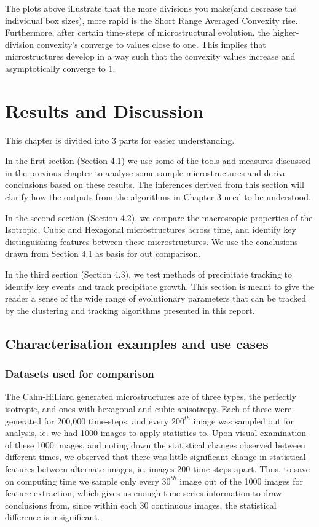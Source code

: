 \documentclass[12pt, a4paper]{report}
\begin{document}
The plots above illustrate that the more divisions you make(and decrease the individual box sizes), more rapid is the Short Range Averaged Convexity rise. Furthermore, after certain time-steps of microstructural evolution, the higher-division convexity's converge to values close to one. This implies that microstructures develop in a way such that the convexity values increase and asymptotically converge to 1.



\chapter{Results and Discussion}
This chapter is divided into 3 parts for easier understanding. 

In the first section (Section 4.1) we use some of the tools and measures discussed in the previous chapter to analyse some sample microstructures and derive conclusions based on these results. The inferences derived from this section will clarify how the outputs from the algorithms in Chapter 3 need to be understood. 

In the second section (Section 4.2), we compare the macroscopic properties of the Isotropic, Cubic and Hexagonal microstructures across time, and identify key distinguishing features between these microstructures. We use the conclusions drawn from Section 4.1 as basis for out comparison.

In the third section (Section 4.3), we test methods of precipitate tracking to identify key events and track precipitate growth. This section is meant to give the reader a sense of the wide range of evolutionary parameters that can be tracked by the clustering and tracking algorithms presented in this report.

\section{Characterisation examples and use cases}
\subsection{Datasets used for comparison}
The Cahn-Hilliard generated microstructures are of three types, the perfectly isotropic, and ones with hexagonal and cubic anisotropy. Each of these were generated for 200,000 time-steps, and every $200^{th}$ image was sampled out for analysis, ie. we had 1000 images to apply statistics to. Upon visual examination of these 1000 images, and noting down the statistical changes observed between different times, we observed that there was little significant change in statistical features between alternate images, ie. images 200 time-steps apart. Thus, to save on computing time we sample only every $30^{th}$  image out of the 1000 images for feature extraction, which gives us enough time-series information to draw conclusions from, since within each 30 continuous images, the statistical difference is insignificant. 
\end{document}
